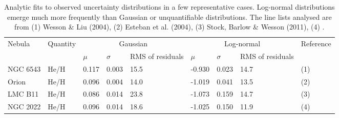 \documentclass[useAMS,usenatbib]{mn2e}
\begin{document}
\begin{table}
\begin{tabular}{lllllllll}
\hline
Nebula & Quantity & \multicolumn{3}{c}{Gaussian} & \multicolumn{3}{c}{Log-normal} & Reference \\
       &          & $\mu$ & $\sigma$ & RMS of residuals & $\mu$ & $\sigma$ & RMS of residuals\\
\hline
NGC 6543 & He/H     & 0.117 & 0.003 & 15.5 & -0.930 & 0.023 & 14.7 & (1) \\
Orion    & He/H     & 0.096 & 0.004 & 14.0 & -1.019 & 0.041 & 13.5 & (2) \\
LMC B11  & He/H     & 0.086 & 0.014 & 23.8 & -1.073 & 0.159 & 14.7 & (3) \\
NGC 2022 & He/H     & 0.096 & 0.014 & 18.6 & -1.025 & 0.150 & 11.9 & (4) \\
\hline
\end{tabular}
\label{Typical_undertainties_table}
\caption{Analytic fits to observed uncertainty distributions in a few representative cases.  Log-normal distributions emerge much more frequently than Gaussian or unquantifiable distributions.  The line lists analysed are from (1) Wesson \& Liu (2004), (2) Esteban et al. (2004), (3) Stock, Barlow \& Wesson (2011), (4) \citet{2005A&A...436..953P}.}%
\end{table}
\end{document}
